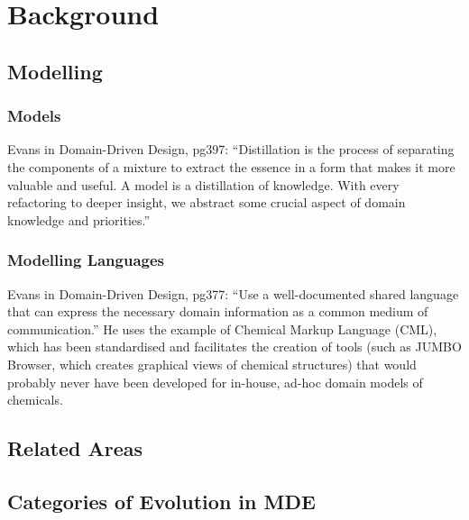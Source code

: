
\chapter{Background}
\label{Background}

\section{Modelling}

\subsection{Models}

Evans in Domain-Driven Design, pg397: ``Distillation is the process of separating the components of a mixture to extract the essence in a form that makes it more valuable and useful. A model is a distillation of knowledge. With every refactoring to deeper insight, we abstract some crucial aspect of domain knowledge and priorities.''

\subsection{Modelling Languages}

Evans in Domain-Driven Design, pg377: ``Use a well-documented shared language that can express the necessary domain information as a common medium of communication.'' He uses the example of Chemical Markup Language (CML), which has been standardised and facilitates the creation of tools (such as JUMBO Browser, which creates graphical views of chemical structures) that would probably never have been developed for in-house, ad-hoc domain models of chemicals.


\section{Related Areas}

\section{Categories of Evolution in MDE}
